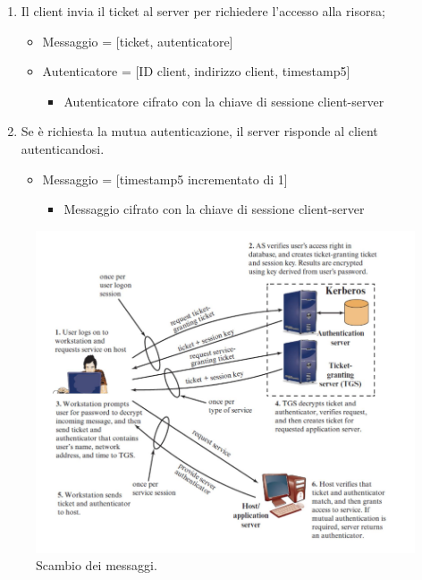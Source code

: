 \begin{enumerate}
\begin{itemize}
\begin{itemize}
		\end{itemize}
	\end{itemize}
	\item Il client invia il ticket al server per richiedere l'accesso alla risorsa;
    \begin{itemize}
        \item Messaggio = [ticket, autenticatore]
		\item Autenticatore = [ID client, indirizzo client, timestamp5]
		\begin{itemize}
		    \item Autenticatore cifrato con la chiave di sessione client-server
		\end{itemize}
    \end{itemize}
	\item Se è richiesta la mutua autenticazione, il server risponde al client autenticandosi.
	\begin{itemize}
	    \item Messaggio = [timestamp5 incrementato di 1]
		\begin{itemize}
		    \item Messaggio cifrato con la chiave di sessione client-server
		\end{itemize}
	\end{itemize}
\end{enumerate}

\begin{figure}
    \centering
    \includegraphics[width=1\textwidth]{images/chapter4/4-1.png}
    \caption{Scambio dei messaggi.}
    \label{fig:4-1}
\end{figure}

